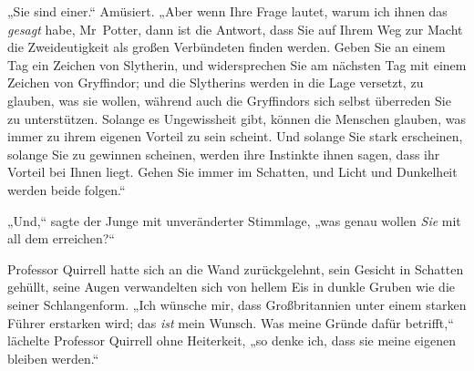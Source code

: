 „Sie sind einer.“ Amüsiert. „Aber wenn Ihre Frage lautet, warum ich ihnen das \emph{gesagt} habe, Mr~Potter, dann ist die Antwort, dass Sie auf Ihrem Weg zur Macht die Zweideutigkeit als großen Verbündeten finden werden. Geben Sie an einem Tag ein Zeichen von Slytherin, und widersprechen Sie am nächsten Tag mit einem Zeichen von Gryffindor; und die Slytherins werden in die Lage versetzt, zu glauben, was sie wollen, während auch die Gryffindors sich selbst überreden Sie zu unterstützen. Solange es Ungewissheit gibt, können die Menschen glauben, was immer zu ihrem eigenen Vorteil zu sein scheint. Und solange Sie stark erscheinen, solange Sie zu gewinnen scheinen, werden ihre Instinkte ihnen sagen, dass ihr Vorteil bei Ihnen liegt. Gehen Sie immer im Schatten, und Licht und Dunkelheit werden beide folgen.“

„Und,“ sagte der Junge mit unveränderter Stimmlage, „was genau wollen \emph{Sie} mit all dem erreichen?“

Professor Quirrell hatte sich an die Wand zurückgelehnt, sein Gesicht in Schatten gehüllt, seine Augen verwandelten sich von hellem Eis in dunkle Gruben wie die seiner Schlangenform. „Ich wünsche mir, dass Großbritannien unter einem starken Führer erstarken wird; das \emph{ist} mein Wunsch. Was meine Gründe dafür betrifft,“ lächelte Professor Quirrell ohne Heiterkeit, „so denke ich, dass sie meine eigenen bleiben werden.“

